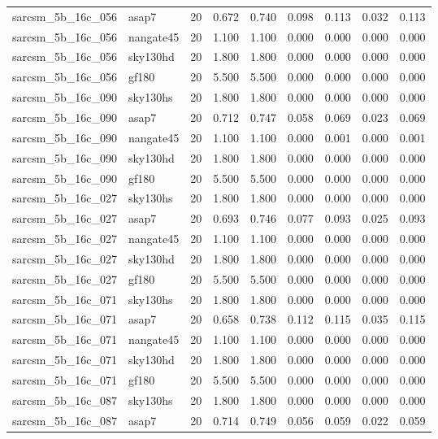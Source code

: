\begin{tabular}{llrrrrrrr}
sarcsm\_5b\_16c\_056 & asap7 & 20 & 0.672 & 0.740 & 0.098 & 0.113 & 0.032 & 0.113 \\
sarcsm\_5b\_16c\_056 & nangate45 & 20 & 1.100 & 1.100 & 0.000 & 0.000 & 0.000 & 0.000 \\
sarcsm\_5b\_16c\_056 & sky130hd & 20 & 1.800 & 1.800 & 0.000 & 0.000 & 0.000 & 0.000 \\
sarcsm\_5b\_16c\_056 & gf180 & 20 & 5.500 & 5.500 & 0.000 & 0.000 & 0.000 & 0.000 \\
sarcsm\_5b\_16c\_090 & sky130hs & 20 & 1.800 & 1.800 & 0.000 & 0.000 & 0.000 & 0.000 \\
sarcsm\_5b\_16c\_090 & asap7 & 20 & 0.712 & 0.747 & 0.058 & 0.069 & 0.023 & 0.069 \\
sarcsm\_5b\_16c\_090 & nangate45 & 20 & 1.100 & 1.100 & 0.000 & 0.001 & 0.000 & 0.001 \\
sarcsm\_5b\_16c\_090 & sky130hd & 20 & 1.800 & 1.800 & 0.000 & 0.000 & 0.000 & 0.000 \\
sarcsm\_5b\_16c\_090 & gf180 & 20 & 5.500 & 5.500 & 0.000 & 0.000 & 0.000 & 0.000 \\
sarcsm\_5b\_16c\_027 & sky130hs & 20 & 1.800 & 1.800 & 0.000 & 0.000 & 0.000 & 0.000 \\
sarcsm\_5b\_16c\_027 & asap7 & 20 & 0.693 & 0.746 & 0.077 & 0.093 & 0.025 & 0.093 \\
sarcsm\_5b\_16c\_027 & nangate45 & 20 & 1.100 & 1.100 & 0.000 & 0.000 & 0.000 & 0.000 \\
sarcsm\_5b\_16c\_027 & sky130hd & 20 & 1.800 & 1.800 & 0.000 & 0.000 & 0.000 & 0.000 \\
sarcsm\_5b\_16c\_027 & gf180 & 20 & 5.500 & 5.500 & 0.000 & 0.000 & 0.000 & 0.000 \\
sarcsm\_5b\_16c\_071 & sky130hs & 20 & 1.800 & 1.800 & 0.000 & 0.000 & 0.000 & 0.000 \\
sarcsm\_5b\_16c\_071 & asap7 & 20 & 0.658 & 0.738 & 0.112 & 0.115 & 0.035 & 0.115 \\
sarcsm\_5b\_16c\_071 & nangate45 & 20 & 1.100 & 1.100 & 0.000 & 0.000 & 0.000 & 0.000 \\
sarcsm\_5b\_16c\_071 & sky130hd & 20 & 1.800 & 1.800 & 0.000 & 0.000 & 0.000 & 0.000 \\
sarcsm\_5b\_16c\_071 & gf180 & 20 & 5.500 & 5.500 & 0.000 & 0.000 & 0.000 & 0.000 \\
sarcsm\_5b\_16c\_087 & sky130hs & 20 & 1.800 & 1.800 & 0.000 & 0.000 & 0.000 & 0.000 \\
sarcsm\_5b\_16c\_087 & asap7 & 20 & 0.714 & 0.749 & 0.056 & 0.059 & 0.022 & 0.059 \\

\end{tabular}
